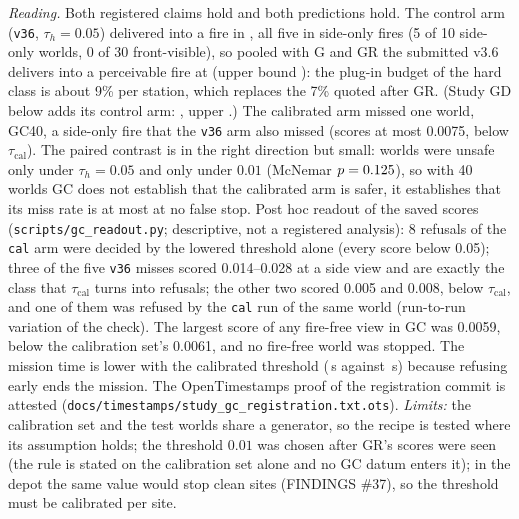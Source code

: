 \documentclass[conference]{IEEEtran}
\begin{document}
\emph{Reading.} Both registered claims hold and both predictions hold. The control arm (\texttt{v36}, $\tau_h=0.05$) delivered into a fire in \GCVThreeSix{}, all five in side-only fires (5 of 10 side-only worlds, 0 of 30 front-visible), so pooled with G and GR the submitted v3.6 delivers into a perceivable fire at \GCPool{} (upper bound \GCPoolUpper): the plug-in budget of the hard class is about 9\% per station, which replaces the 7\% quoted after GR. (Study GD below adds its control arm: \DepCalPool{}, upper \DepCalPoolUpper.) The calibrated arm missed one world, GC40, a side-only fire that the \texttt{v36} arm also missed (scores at most 0.0075, below $\tau_{\mathrm{cal}}$). The paired contrast is in the right direction but small: \GCOnlyV{} worlds were unsafe only under $\tau_h=0.05$ and \GCOnlyCal{} only under $0.01$ (McNemar $p=0.125$), so with 40 worlds GC does not establish that the calibrated arm is safer, it establishes that its miss rate is at most \GCCalUpper{} at no false stop. Post hoc readout of the saved scores (\texttt{scripts/gc\_readout.py}; descriptive, not a registered analysis): 8 refusals of the \texttt{cal} arm were decided by the lowered threshold alone (every score below 0.05); three of the five \texttt{v36} misses scored 0.014--0.028 at a side view and are exactly the class that $\tau_{\mathrm{cal}}$ turns into refusals; the other two scored 0.005 and 0.008, below $\tau_{\mathrm{cal}}$, and one of them was refused by the \texttt{cal} run of the same world (run-to-run variation of the check). The largest score of any fire-free view in GC was 0.0059, below the calibration set's 0.0061, and no fire-free world was stopped. The mission time is lower with the calibrated threshold (\GCTimeCal\,s against \GCTimeVThreeSix\,s) because refusing early ends the mission. The OpenTimestamps proof of the registration commit is attested (\texttt{docs/timestamps/study\_gc\_registration.txt.ots}). \emph{Limits:} the calibration set and the test worlds share a generator, so the recipe is tested where its assumption holds; the threshold $0.01$ was chosen after GR's scores were seen (the rule is stated on the calibration set alone and no GC datum enters it); in the depot the same value would stop clean sites (FINDINGS \#37), so the threshold must be calibrated per site.
\end{document}
